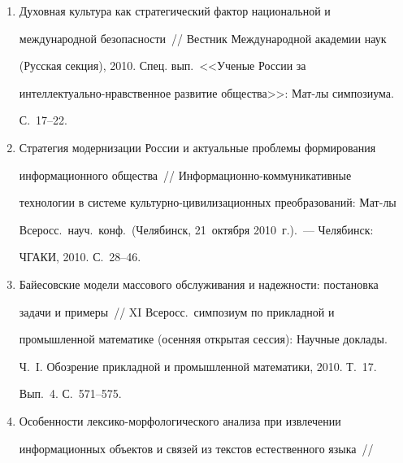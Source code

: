\begin{enumerate}[1.]
Эволюция лингво-семантических пред\-став\-ле\-ний в интеллектуальных 


сис\-темах на основе расширенных семантических сетей~/\!\!/  Компьютерная 


лингвистика и интеллектуальные технологии: По материалам ежегодной 


Междунар.\ конф.\ <<Диалог>> (Бекасово, 26--30~мая 2010). 


Вып.~9(16).~--- М.: РГГУ, 2010. С.~205--212.


\item {}


Духовная культура как стратегический фактор национальной и 


международной безопасности~/\!\!/  Вестник Международной академии наук 


(Русская секция), 2010. Спец. вып.~<<Ученые России за 


интеллектуально-нрав\-ст\-вен\-ное развитие общества>>: Мат-лы симпозиума. 


С.~17--22.


\item {}


Стратегия модернизации России и актуальные проблемы формирования 


информационного общества~/\!\!/  Информационно-ком\-му\-ни\-ка\-тив\-ные 


технологии в сис\-теме культурно-цивилизационных преобразований: Мат-лы 


Всеросс.\ науч.\ конф.\ (Челябинск, 21~октября 2010~г.).~--- Челябинск: 


ЧГАКИ, 2010. С.~28--46.


\item {}


Байесовские модели массового обслуживания и надежности: постановка 


задачи и примеры~/\!\!/  XI Всеросс.\ симпозиум по прикладной и 


промышленной математике (осенняя открытая сессия): Научные доклады. 


Ч.~I. Обозрение прикладной и промышленной математики, 2010. Т.~17. 


Вып.~4. С.~571--575.


\item {}


Особенности лексико-морфологического анализа при извлечении 


информационных объектов и связей из текстов естественного языка~/\!\!/  



\end{enumerate}
